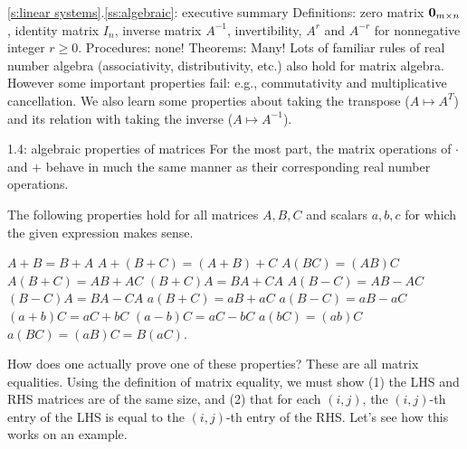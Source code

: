 \begin{frame}{\ref{s:linear systems}.\ref{ss:algebraic}: executive summary}\footnotesize
\alert{Definitions}: zero matrix ${\mathbf 0}_{m\times n}$, identity matrix $I_n$, inverse matrix $A^{-1}$, invertibility, $A^r$ and $A^{-r}$ for nonnegative integer $r\geq 0$.  
\bspace
\alert{Procedures}: none!
\bspace
\alert{Theorems}: Many! Lots of familiar rules of real number algebra (associativity, distributivity, etc.) also hold for matrix algebra. However some important properties fail: e.g., commutativity and multiplicative cancellation. We also learn some properties about taking the transpose ($A\mapsto A^T$) and its relation with taking the inverse ($A\mapsto A^{-1}$).  
\end{frame}
\begin{frame}{1.4: algebraic properties of matrices}\footnotesize
For the most part, the matrix operations of $\cdot$ and $+$ behave in much the same manner as their corresponding real number operations. \begin{theorem}\label{th:matrix-arith}
The following properties hold for all matrices $A, B, C$ and scalars $a, b, c$ for which the given expression makes sense. 
\begin{multicols}{2}
\bb[(a)]
\ii $A+B=B+A$
\ii $A+(B+C)=(A+B)+C$
\ii $A(BC)=(AB)C$
\ii $A(B+C)=AB+AC$
\ii $(B+C)A=BA+CA$
\ii $A(B-C)=AB-AC$
\ii $(B-C)A=BA-CA$
\ii $a(B+C)=aB+aC$
\ii $a(B-C)=aB-aC$
\ii $(a+b)C=aC+bC$
\ii $(a-b)C=aC-bC$
\ii $a(bC)=(ab)C$
\ii $a(BC)=(aB)C=B(aC)$. 
\ee 
\end{multicols}
\end{theorem} 
How does one actually prove one of these properties? 
\bpause
These are all \alert{matrix equalities}. Using the definition of matrix equality, we must show (1) the LHS and RHS matrices are of the same size, and (2) that for each $(i,j)$, the $(i,j)$-th entry of the LHS is equal to the $(i,j)$-th entry of the RHS. Let's see how this works on an example. 

\end{frame}
